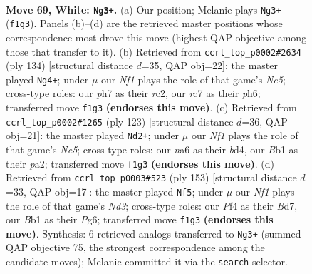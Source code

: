\documentclass[11pt]{article}
\begin{document}
\clearpage

\begin{figure}[p]\centering
\begin{subfigure}{0.46\textwidth}\centering
\resizebox{\linewidth}{!}{%
\newchessgame
\chessboard[
  setfen={8/2r2p1p/n5p1/4P3/b4Pp1/8/4k1KP/1B3N2 w - - 28 69},
  showmover=false,
  pgfstyle=straightmove, color=movearrow, markmove={f1-g3}
]}
\caption{}
\end{subfigure}\hfill
\begin{subfigure}{0.46\textwidth}\centering
\resizebox{\linewidth}{!}{%
\newchessgame
\chessboard[
  setfen={8/8/5k1p/4N1p1/5p2/5P1P/2r3P1/4BK2 w - - 38 68},
  showmover=false,
  pgfstyle=straightmove, color=movearrow, markmove={e5-g4}
]}
\caption{}
\end{subfigure}
\\[4pt]
\begin{subfigure}{0.46\textwidth}\centering
\resizebox{\linewidth}{!}{%
\newchessgame
\chessboard[
  setfen={8/4k2p/4p3/1B2Pp1P/3BnP2/p4K2/P7/2b5 b - - 5 62},
  showmover=false,
  pgfstyle=straightmove, color=movearrow, markmove={e4-d2}
]}
\caption{}
\end{subfigure}\hfill
\begin{subfigure}{0.46\textwidth}\centering
\resizebox{\linewidth}{!}{%
\newchessgame
\chessboard[
  setfen={8/3bkp2/3n2p1/4P3/5P1P/2R2K2/1P6/8 b - - 36 77},
  showmover=false,
  pgfstyle=straightmove, color=movearrow, markmove={d6-f5}
]}
\caption{}
\end{subfigure}
\caption{\textbf{Move 69, White: \texttt{Ng3+}.} (a) Our position; Melanie plays \texttt{Ng3+} (\texttt{f1g3}). Panels (b)--(d) are the retrieved master positions whose correspondence most drove this move (highest QAP objective among those that transfer to it). (b) Retrieved from \texttt{ccrl\_top\_p0002\#2634} (ply 134) [structural distance $d$=35, QAP obj=22]: the master played \texttt{Ng4+}; under $\mu$ our \emph{Nf1} plays the role of that game's \emph{Ne5}; cross-type roles: our \emph{p}h7 as their \emph{r}c2, our \emph{r}c7 as their \emph{p}h6; transferred move \texttt{f1g3} \textbf{(endorses this move)}. (c) Retrieved from \texttt{ccrl\_top\_p0002\#1265} (ply 123) [structural distance $d$=36, QAP obj=21]: the master played \texttt{Nd2+}; under $\mu$ our \emph{Nf1} plays the role of that game's \emph{Ne5}; cross-type roles: our \emph{n}a6 as their \emph{b}d4, our \emph{B}b1 as their \emph{p}a2; transferred move \texttt{f1g3} \textbf{(endorses this move)}. (d) Retrieved from \texttt{ccrl\_top\_p0003\#523} (ply 153) [structural distance $d$=33, QAP obj=17]: the master played \texttt{Nf5}; under $\mu$ our \emph{Nf1} plays the role of that game's \emph{Nd3}; cross-type roles: our \emph{P}f4 as their \emph{B}d7, our \emph{B}b1 as their \emph{P}g6; transferred move \texttt{f1g3} \textbf{(endorses this move)}. Synthesis: 6 retrieved analogs transferred to \texttt{Ng3+} (summed QAP objective 75, the strongest correspondence among the candidate moves); Melanie committed it via the \texttt{search} selector.}
\label{fig:thought-m136}
\end{figure}
\end{document}
